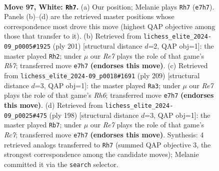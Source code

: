 \documentclass[11pt]{article}
\begin{document}
\clearpage

\begin{figure}[p]\centering
\begin{subfigure}{0.46\textwidth}\centering
\resizebox{\linewidth}{!}{%
\newchessgame
\chessboard[
  setfen={8/4R3/2k5/5K2/8/1N6/6P1/3r4 w - - 58 97},
  showmover=false,
  pgfstyle=straightmove, color=movearrow, markmove={e7-h7}
]}
\caption{}
\end{subfigure}\hfill
\begin{subfigure}{0.46\textwidth}\centering
\resizebox{\linewidth}{!}{%
\newchessgame
\chessboard[
  setfen={8/4k3/8/n7/8/2R5/1r6/4K3 b - - 89 101},
  showmover=false,
  pgfstyle=straightmove, color=movearrow, markmove={b2-h2}
]}
\caption{}
\end{subfigure}
\\[4pt]
\begin{subfigure}{0.46\textwidth}\centering
\resizebox{\linewidth}{!}{%
\newchessgame
\chessboard[
  setfen={5R2/8/4k3/2p5/8/7r/2K5/8 b - - 7 105},
  showmover=false,
  pgfstyle=straightmove, color=movearrow, markmove={h3-a3}
]}
\caption{}
\end{subfigure}\hfill
\begin{subfigure}{0.46\textwidth}\centering
\resizebox{\linewidth}{!}{%
\newchessgame
\chessboard[
  setfen={4k3/2R5/8/8/8/5P1K/8/r7 w - - 5 100},
  showmover=false,
  pgfstyle=straightmove, color=movearrow, markmove={c7-b7}
]}
\caption{}
\end{subfigure}
\caption{\textbf{Move 97, White: \texttt{Rh7}.} (a) Our position; Melanie plays \texttt{Rh7} (\texttt{e7h7}). Panels (b)--(d) are the retrieved master positions whose correspondence most drove this move (highest QAP objective among those that transfer to it). (b) Retrieved from \texttt{lichess\_elite\_2024-09\_p0005\#1925} (ply 201) [structural distance $d$=2, QAP obj=1]: the master played \texttt{Rh2}; under $\mu$ our \emph{Re7} plays the role of that game's \emph{Rb7}; transferred move \texttt{e7h7} \textbf{(endorses this move)}. (c) Retrieved from \texttt{lichess\_elite\_2024-09\_p0018\#1691} (ply 209) [structural distance $d$=3, QAP obj=1]: the master played \texttt{Ra3}; under $\mu$ our \emph{Re7} plays the role of that game's \emph{Rh6}; transferred move \texttt{e7h7} \textbf{(endorses this move)}. (d) Retrieved from \texttt{lichess\_elite\_2024-09\_p0025\#475} (ply 198) [structural distance $d$=3, QAP obj=1]: the master played \texttt{Rb7}; under $\mu$ our \emph{Re7} plays the role of that game's \emph{Rc7}; transferred move \texttt{e7h7} \textbf{(endorses this move)}. Synthesis: 4 retrieved analogs transferred to \texttt{Rh7} (summed QAP objective 3, the strongest correspondence among the candidate moves); Melanie committed it via the \texttt{search} selector.}
\label{fig:thought-m192}
\end{figure}
\end{document}
